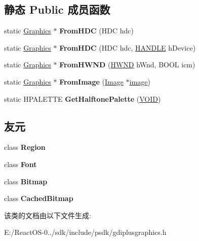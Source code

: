 \subsection*{静态 Public 成员函数}
\begin{DoxyCompactItemize}
\item 
\mbox{\label{class_graphics_afcc31ff3fe279adb708ddaecf2f61573}} 
static \hyperlink{class_graphics}{Graphics} $\ast$ {\bfseries From\+H\+DC} (H\+DC hdc)
\item 
\mbox{\label{class_graphics_aea8b30df9252f547ac4a8d2e28dc1cb0}} 
static \hyperlink{class_graphics}{Graphics} $\ast$ {\bfseries From\+H\+DC} (H\+DC hdc, \hyperlink{interfacevoid}{H\+A\+N\+D\+LE} h\+Device)
\item 
\mbox{\label{class_graphics_ac3a4d24f685d3b5dc86eb961adbc4822}} 
static \hyperlink{class_graphics}{Graphics} $\ast$ {\bfseries From\+H\+W\+ND} (\hyperlink{interfacevoid}{H\+W\+ND} h\+Wnd, B\+O\+OL icm)
\item 
\mbox{\label{class_graphics_aaf2b5bbe8ee86ab23f3d23fc3dd07627}} 
static \hyperlink{class_graphics}{Graphics} $\ast$ {\bfseries From\+Image} (\hyperlink{class_image}{Image} $\ast$\hyperlink{interfacevoid}{image})
\item 
\mbox{\label{class_graphics_a73198deb78404de1b76774a01f1be97b}} 
static H\+P\+A\+L\+E\+T\+TE {\bfseries Get\+Halftone\+Palette} (\hyperlink{interfacevoid}{V\+O\+ID})
\end{DoxyCompactItemize}
\subsection*{友元}
\begin{DoxyCompactItemize}
\item 
\mbox{\label{class_graphics_aae6f9325706131f3b6fb8accb1508d76}} 
class {\bfseries Region}
\item 
\mbox{\label{class_graphics_ad564b94b59dc295de3dfc4415d95cca8}} 
class {\bfseries Font}
\item 
\mbox{\label{class_graphics_a08f4603d248cce6ab74c80f858f877b0}} 
class {\bfseries Bitmap}
\item 
\mbox{\label{class_graphics_aaa35f40f41b165fc13608e0c2e636f87}} 
class {\bfseries Cached\+Bitmap}
\end{DoxyCompactItemize}


该类的文档由以下文件生成\+:\begin{DoxyCompactItemize}
\item 
E\+:/\+React\+O\+S-\/0../sdk/include/psdk/gdiplusgraphics.\+h\end{DoxyCompactItemize}
